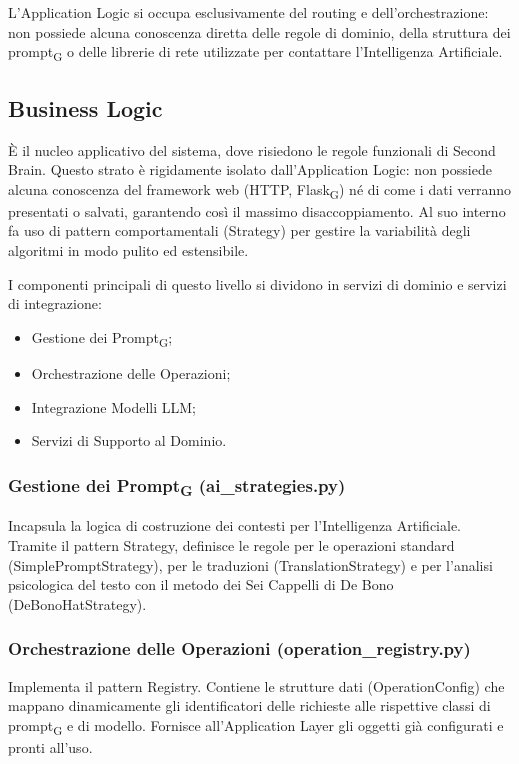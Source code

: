 \documentclass[11pt,a4paper]{article}
\newcommand{\gls}[1]{#1\textsubscript{G}}
\begin{document}
L'Application Logic si occupa esclusivamente del routing e dell'orchestrazione: non possiede alcuna conoscenza diretta delle regole di dominio, della struttura dei \gls{prompt} o delle librerie di rete utilizzate per contattare l'Intelligenza Artificiale.


\subsection{Business Logic}
È il nucleo applicativo del sistema, dove risiedono le regole funzionali di Second Brain. Questo strato è rigidamente isolato dall'Application Logic: non possiede alcuna conoscenza del framework web (HTTP, \gls{Flask}) né di come i dati verranno presentati o salvati, garantendo così il massimo disaccoppiamento. Al suo interno fa uso di pattern comportamentali (Strategy) per gestire la variabilità degli algoritmi in modo pulito ed estensibile.

I componenti principali di questo livello si dividono in servizi di dominio e servizi di integrazione:
\begin{itemize}
    \item Gestione dei \gls{Prompt};
    \item Orchestrazione delle Operazioni;
    \item Integrazione Modelli LLM;
    \item Servizi di Supporto al Dominio.
\end{itemize}

\subsubsection{Gestione dei \gls{Prompt} (ai\_strategies.py)}
Incapsula la logica di costruzione dei contesti per l'Intelligenza Artificiale. Tramite il pattern Strategy, definisce le regole per le operazioni standard (SimplePromptStrategy), per le traduzioni (TranslationStrategy) e per l’analisi psicologica del testo con il metodo dei Sei Cappelli di De Bono (DeBonoHatStrategy).

\subsubsection{Orchestrazione delle Operazioni (operation\_registry.py)}
Implementa il pattern Registry. Contiene le strutture dati (OperationConfig) che mappano dinamicamente gli identificatori delle richieste alle rispettive classi di \gls{prompt} e di modello. Fornisce all'Application Layer gli oggetti già configurati e pronti all'uso.
\end{document}
